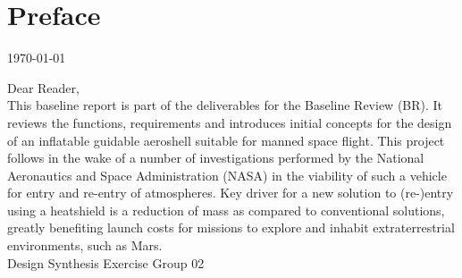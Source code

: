 \section*{Preface}\label{cha:preface}

\begin{flushright}
	\today
\end{flushright}

Dear Reader,	
\\ [1cm]
This baseline report is part of the deliverables for the Baseline Review (BR). It reviews the functions, requirements and introduces initial concepts for the design of an inflatable guidable aeroshell suitable for manned space flight. This project follows in the wake of a number of investigations performed by the National Aeronautics and Space Administration (NASA) in the viability of such a vehicle for entry and re-entry of atmospheres. Key driver for a new solution to (re-)entry using a heatshield is a reduction of mass as compared to conventional solutions, greatly benefiting launch costs for missions to explore and inhabit extraterrestrial environments, such as Mars. 
\\ [1.5cm]
Design Synthesis Exercise Group 02